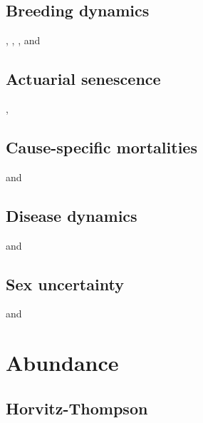 \documentclass[
  12pt,
]{krantz}
\begin{document}
\hypertarget{breeding-dynamics}{%
\section{Breeding dynamics}\label{breeding-dynamics}}

\citet{pradel_breeding_2012}, \citet{desprez_now_2011}, \citet{desprez_known_2013}, and \citet{pacoureau_population_2019}

\hypertarget{actuarial-senescence}{%
\section{Actuarial senescence}\label{actuarial-senescence}}

\citet{choquet_semi-markov_2011}, \citet{peron_evidence_2016}

\hypertarget{cause-specific-mortalities}{%
\section{Cause-specific mortalities}\label{cause-specific-mortalities}}

\citet{fernandez-chacon_causes_2016} and \citet{ruette_comparative_2015}

\hypertarget{disease-dynamics}{%
\section{Disease dynamics}\label{disease-dynamics}}

\citet{MarescotEtAl2018} and \citet{santoro_multi-event_2014}

\hypertarget{sex-uncertainty}{%
\section{Sex uncertainty}\label{sex-uncertainty}}

\citet{PradelEtAl2008} and \citet{genovart_exploiting_2012}

\hypertarget{abundance}{%
\chapter{Abundance}\label{abundance}}

\hypertarget{horvitz-thompson}{%
\section{Horvitz-Thompson}\label{horvitz-thompson}}
\end{document}
